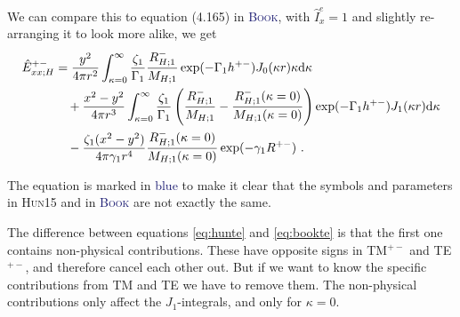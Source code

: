 \documentclass[fontsize=9pt, parskip=half, notitlepage, fleqn]{scrartcl}
\newcommand{\bkcol}[1]{\textcolor{MidnightBlue}{#1\xspace}}
\newcommand{\hun}{\textsc{Hun15}\xspace}
\newcommand{\book}{\bkcol{\textsc{Book}}\xspace}
\begin{document}
We can compare this to equation (4.165) in \book, with $\hat{I}^e_x=1$ and
slightly re-arranging it to look more alike, we get
%
\bkcol{
\begin{align}
  \hat{E}^{+-}_{xx;H} &= \frac{y^2}{4\pi r^2}
  \int^\infty_{\kappa=0} \frac{\zeta_1}{\Gamma_1} 
  \frac{R^-_{H;1}}{M_{H;1}}
  \exp(-\Gamma_1 h^{+-})J_0(\kappa r)\kappa\rm{d}\kappa \nonumber \\
  &\quad + \frac{x^2-y^2}{4\pi r^3}
  \int^\infty_{\kappa=0} \frac{\zeta_1}{\Gamma_1} 
  \left(\frac{R^-_{H;1}}{M_{H;1}} -
  \frac{R^-_{H;1}(\kappa=0)}{M_{H;1}(\kappa=0)}\right)
  \exp(-\Gamma_1 h^{+-})J_1(\kappa r)\rm{d}\kappa \nonumber \\
  &\quad - \frac{\zeta_1 (x^2-y^2)}{4\pi\gamma_1 r^4}
  \frac{R^-_{H;1}(\kappa=0)}{M_{H;1}(\kappa=0)}
  \exp(-\gamma_1 R^{+-}) \ .
  \label{eq:bookte}
\end{align}
}

The equation is marked in \bkcol{blue} to make it clear that the symbols and
parameters in \hun and in \book are not exactly the same.

The difference between equations \ref{eq:hunte} and \ref{eq:bookte} is that the
first one contains non-physical contributions. These have opposite signs in
TM$^{+-}$ and TE$^{+-}$, and therefore cancel each other out. But if we want to
know the specific contributions from TM and TE we have to remove them. The
non-physical contributions only affect the $J_1$-integrals, and only for
$\kappa = 0$.
\end{document}
